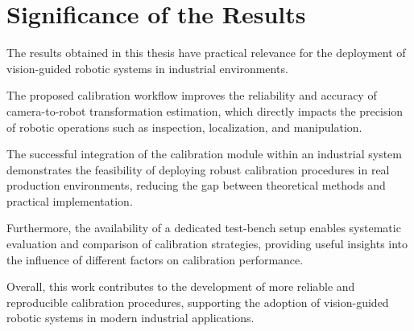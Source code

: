 \section{Significance of the Results}
\label{sec:significance}

The results obtained in this thesis have practical relevance for the deployment
of vision-guided robotic systems in industrial environments.

The proposed calibration workflow improves the reliability and accuracy of
camera-to-robot transformation estimation, which directly impacts the precision
of robotic operations such as inspection, localization, and manipulation.

The successful integration of the calibration module within an industrial
system demonstrates the feasibility of deploying robust calibration procedures
in real production environments, reducing the gap between theoretical methods
and practical implementation.

Furthermore, the availability of a dedicated test-bench setup enables systematic
evaluation and comparison of calibration strategies, providing useful insights
into the influence of different factors on calibration performance.

Overall, this work contributes to the development of more reliable and
reproducible calibration procedures, supporting the adoption of vision-guided
robotic systems in modern industrial applications.










